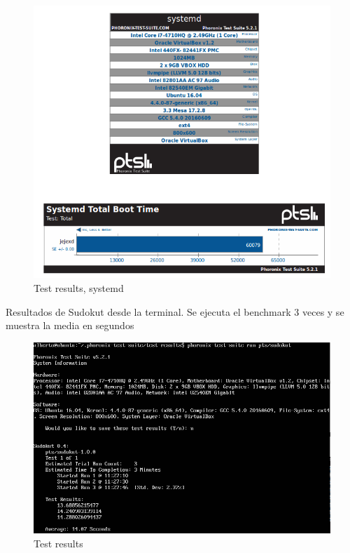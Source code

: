 \begin{figure}[h]
	\centering
	\includegraphics[scale=0.35]{images/terminal.png}
	\caption{Test results, systemd}
\end{figure}

Resultados de Sudokut desde la terminal. Se ejecuta el benchmark 3 veces y se muestra la media en segundos

\begin{figure}[h]
	\centering
	\includegraphics[scale=0.35]{images/fotito.png}
	\caption{Test results}
\end{figure}


\newpage

